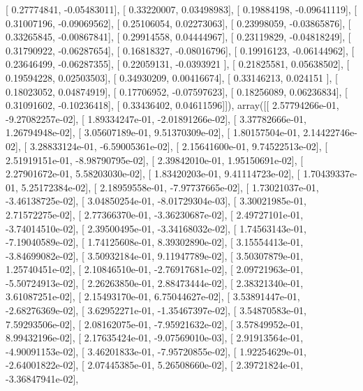 \documentclass{article}
\begin{document}
       [ 0.27774841, -0.05483011],
       [ 0.33220007,  0.03498983],
       [ 0.19884198, -0.09641119],
       [ 0.31007196, -0.09069562],
       [ 0.25106054,  0.02273063],
       [ 0.23998059, -0.03865876],
       [ 0.33265845, -0.00867841],
       [ 0.29914558,  0.04444967],
       [ 0.23119829, -0.04818249],
       [ 0.31790922, -0.06287654],
       [ 0.16818327, -0.08016796],
       [ 0.19916123, -0.06144962],
       [ 0.23646499, -0.06287355],
       [ 0.22059131, -0.0393921 ],
       [ 0.21825581,  0.05638502],
       [ 0.19594228,  0.02503503],
       [ 0.34930209,  0.00416674],
       [ 0.33146213,  0.024151  ],
       [ 0.18023052,  0.04874919],
       [ 0.17706952, -0.07597623],
       [ 0.18256089,  0.06236834],
       [ 0.31091602, -0.10236418],
       [ 0.33436402,  0.04611596]]), array([[  2.57794266e-01,  -9.27082257e-02],
       [  1.89334247e-01,  -2.01891266e-02],
       [  3.37782666e-01,   1.26794948e-02],
       [  3.05607189e-01,   9.51370309e-02],
       [  1.80157504e-01,   2.14422746e-02],
       [  3.28833124e-01,  -6.59005361e-02],
       [  2.15641600e-01,   9.74522513e-02],
       [  2.51919151e-01,  -8.98790795e-02],
       [  2.39842010e-01,   1.95150691e-02],
       [  2.27901672e-01,   5.58203030e-02],
       [  1.83420203e-01,   9.41114723e-02],
       [  1.70439337e-01,   5.25172384e-02],
       [  2.18959558e-01,  -7.97737665e-02],
       [  1.73021037e-01,  -3.46138725e-02],
       [  3.04850254e-01,  -8.01729304e-03],
       [  3.30021985e-01,   2.71572275e-02],
       [  2.77366370e-01,  -3.36230687e-02],
       [  2.49727101e-01,  -3.74014510e-02],
       [  2.39500495e-01,  -3.34168032e-02],
       [  1.74563143e-01,  -7.19040589e-02],
       [  1.74125608e-01,   8.39302890e-02],
       [  3.15554413e-01,  -3.84699082e-02],
       [  3.50932184e-01,   9.11947789e-02],
       [  3.50307879e-01,   1.25740451e-02],
       [  2.10846510e-01,  -2.76917681e-02],
       [  2.09721963e-01,  -5.50724913e-02],
       [  2.26263850e-01,   2.88473444e-02],
       [  2.38321340e-01,   3.61087251e-02],
       [  2.15493170e-01,   6.75044627e-02],
       [  3.53891447e-01,  -2.68276369e-02],
       [  3.62952271e-01,  -1.35467397e-02],
       [  3.54870583e-01,   7.59293506e-02],
       [  2.08162075e-01,  -7.95921632e-02],
       [  3.57849952e-01,   8.99432196e-02],
       [  2.17635424e-01,  -9.07569010e-03],
       [  2.91913564e-01,  -4.90091153e-02],
       [  3.46201833e-01,  -7.95720855e-02],
       [  1.92254629e-01,  -2.64001822e-02],
       [  2.07445385e-01,   5.26508660e-02],
       [  2.39721824e-01,  -3.36847941e-02],
\end{document}
